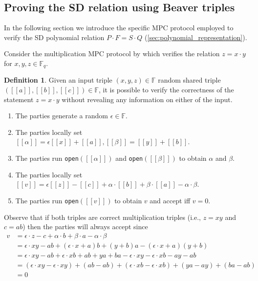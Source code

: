 \documentclass[twoside,11pt,openright]{report}
\theoremstyle{definition}
\newtheorem{definition}{Definition}[section]
\theoremstyle{plain}
\begin{document}
\subsection{Proving the SD relation using Beaver triples}\label{sec:verify}
In the following section we introduce the specific MPC protocol employed to verify the SD polynomial relation $P \cdot F = S \cdot Q$ (\autoref{sec:polynomial_representation}).

Consider the multiplication MPC protocol by \cite{baum2020concretely} which verifies the relation $z = x\cdot y$ for $x,y,z \in \mathbb{F}_q$.

\begin{definition}
  \label{def:beaver}
  Given an input triple $(x,y,z) \in \mathbb{F}$ random shared triple $([[a]], [[b]], [[c]]) \in \mathbb{F}$, it is possible to verify the correctness of the statement $z = x \cdot y$ without revealing any information on either of the input.
  \begin{enumerate}
    \item The parties generate a random $\epsilon \in \mathbb{F}$.
    \item The parties locally set $[[\alpha]] = \epsilon[[x]] + [[a]], [[\beta]] = [[y]] + [[b]]$.
    \item The parties run \texttt{open}$([[\alpha]])$ and \texttt{open}$([[\beta]])$ to obtain $\alpha$ and $\beta$.
    \item The parties locally set $[[v]] = \epsilon[[z]] - [[c]] + \alpha  \cdot [[b]] + \beta  \cdot [[a]] - \alpha  \cdot \beta$.
    \item The parties run \texttt{open}$([[v]])$ to obtain $v$ and accept iff $v = 0$.
  \end{enumerate}
\end{definition}

Observe that if both triples are correct multiplication triples (i.e., $z = xy$ and $c = ab$) then the parties will always accept since
\begin{align}
  v & = \epsilon \cdot z - c + \alpha \cdot b + \beta \cdot a - \alpha \cdot \beta                                            \\
    & = \epsilon \cdot xy - ab + (\epsilon \cdot x + a)b + (y + b)a - (\epsilon \cdot x + a)(y + b)                           \\
    & = \epsilon \cdot xy - ab + \epsilon \cdot xb + ab + ya + ba - \epsilon \cdot xy - \epsilon \cdot xb - ay - ab           \\
    & = (\epsilon \cdot xy - \epsilon \cdot xy) + (ab - ab) + (\epsilon \cdot xb - \epsilon \cdot xb) + (ya - ay) + (ba - ab) \\
    & = 0
\end{align}
\end{document}

